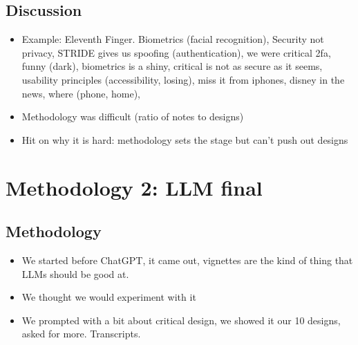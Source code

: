 
\subsection{Discussion}

\begin{itemize}
\item Example: Eleventh Finger. Biometrics (facial recognition), Security not privacy, STRIDE gives us spoofing (authentication), we were critical 2fa, funny (dark), biometrics is a shiny, critical is not as secure as it seems, usability principles (accessibility, losing), miss it from iphones, disney in the news, where (phone, home), 
\item Methodology was difficult (ratio of notes to designs)
\item Hit on why it is hard: methodology sets the stage but can't push out designs
\end{itemize}


\section{Methodology 2: LLM final}

\subsection{Methodology}


\begin{itemize}
\item We started before ChatGPT, it came out, vignettes are the kind of thing that LLMs should be good at.
\item We thought we would experiment with it
\item We prompted with a bit about critical design, we showed it our 10 designs, asked for more. Transcripts.
\end{itemize}

